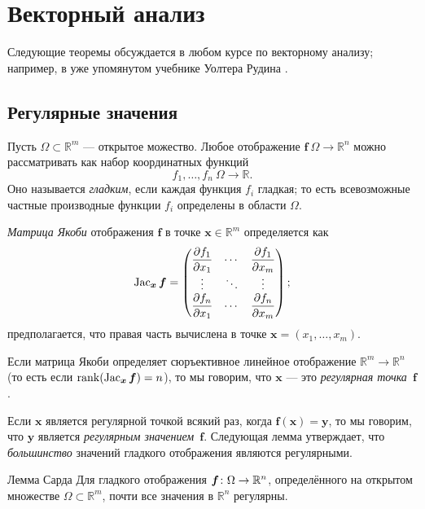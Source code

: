 \section{Векторный анализ}\label{sec:Multivariable calculus}

Следующие теоремы обсуждается в любом курсе по векторному анализу;
например, в уже упомянутом учебнике Уолтера Рудина \cite{rudin}.

\subsection*{Регулярные значения}

Пусть $\Omega\subset\mathbb{R}^m$ --- открытое можество.
Любое отображение $\bm{f}\:\Omega\to\mathbb{R}^n$ можно рассматривать как набор координатных функций
\[f_1,\dots,f_n\:\Omega\to \mathbb{R}.\]
Оно называется \emph{гладким}, если каждая функция $f_i$ гладкая;
то есть всевозможные частные производные функции $f_i$ определены в области $\Omega$.

\emph{Матрица Якоби} отображения $\bm{f}$ в точке $\bm{x}\in\mathbb{R}^m$ определяется как 
\[\mathop{\rm Jac}\nolimits_{\bm{x}}\bm{f}=
\begin{pmatrix}
\dfrac{\partial f_1}{\partial x_1} & \cdots & \dfrac{\partial f_1}{\partial x_m}\\
\vdots & \ddots & \vdots\\
\dfrac{\partial f_n}{\partial x_1} & \cdots & \dfrac{\partial f_n}{\partial x_m} \end{pmatrix};\]
предполагается, что правая часть вычислена в точке $\bm{x}=(x_1,\dots,x_m)$.

Если матрица Якоби определяет сюръективное линейное отображение $\mathbb{R}^m\to\mathbb{R}^n$ (то есть если $\mathop{\rm rank}\nolimits(\mathop{\rm Jac}\nolimits_{\bm{x}}\bm{f})=n$), то мы говорим, что 
$\bm{x}$ --- это \emph{регулярная точка}~$\bm{f}$.

Если $\bm{x}$ является регулярной точкой всякий раз, когда $\bm{f}(\bm{x})=\bm{y}$,
то мы говорим, что $\bm{y}$ является \emph{регулярным значением}~$\bm{f}$.
Следующая лемма утверждает, что \textit{большинство} значений гладкого отображения являются регулярными.

\begin{thm}{Лемма Сарда}\label{lem:sard}
Для гладкого отображения $\bm{f}\colon \Omega \z\to \mathbb{R}^n$, определённого на открытом множестве $\Omega\subset \mathbb{R}^m$, почти все значения в $\mathbb{R}^n$ регулярны.
\end{thm}

